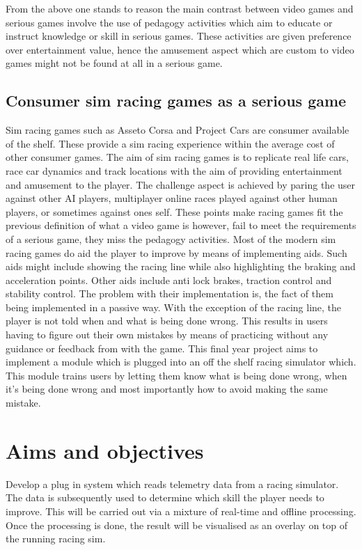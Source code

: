 \documentclass{article}
\begin{document}
From the above one stands to reason the main contrast between video games and serious games involve the use of pedagogy activities which aim to educate or instruct knowledge or skill\cite{zyda2005visual} in serious games. These activities are given preference over entertainment value, hence the amusement aspect which are custom to video games might not be found at all in a serious game\cite{zyda2005visual}.

\subsection{Consumer sim racing games as a serious game}

Sim racing games such as Asseto Corsa and Project Cars are consumer available of the shelf. These provide a sim racing experience within the average cost of other consumer games. The aim of sim racing games is to replicate real life cars, race car dynamics and track locations with the aim of providing entertainment and amusement to the player. The challenge aspect is achieved by paring the user against other AI players, multiplayer online races played against other human players, or sometimes against ones self. These points make racing games fit the previous definition of what a video game is however, fail to meet the requirements of a serious game, they miss the pedagogy activities. Most of the modern sim racing games do aid the player to improve by means of implementing aids. Such aids might include showing the racing line while also highlighting the braking and acceleration points. Other aids include anti lock brakes, traction control and stability control. The problem with their implementation is, the fact of them being implemented in a passive way. With the exception of the racing line, the player is not told when and what is being done wrong. This results in users having to figure out their own mistakes by means of practicing without any guidance or feedback from with the game. This final year project aims to implement a module which is plugged into an off the shelf racing simulator which. This module trains users by letting them know what is being done wrong, when it's being done wrong and most importantly how to avoid making the same mistake.

\section{Aims and objectives}

Develop a plug in system which reads telemetry data from a racing simulator. The data is subsequently used to determine which skill the player needs to improve. This will be carried out via a mixture of real-time and offline processing. Once the processing is done, the result will be visualised as an overlay on top of the running racing sim.
\end{document}
